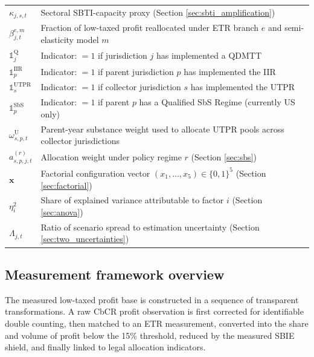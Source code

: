 \documentclass[11pt,a4paper]{article}
\begin{document}
\begin{table}[H]
\begin{tabular}{@{}ll@{}}
$\kappa_{j,s,t}$ & Sectoral SBTI-capacity proxy (Section \ref{sec:sbti_amplification}) \\
$\beta_{j,t}^{e,m}$ & Fraction of low-taxed profit reallocated under ETR branch $e$ and semi-elasticity model $m$ \\
$\mathbb{1}_j^{\text{Q}}$ & Indicator: $=1$ if jurisdiction $j$ has implemented a QDMTT \\
$\mathbb{1}_p^{\text{IIR}}$ & Indicator: $=1$ if parent jurisdiction $p$ has implemented the IIR \\
$\mathbb{1}_s^{\text{UTPR}}$ & Indicator: $=1$ if collector jurisdiction $s$ has implemented the UTPR \\
$\mathbb{1}_p^{\text{SbS}}$ & Indicator: $=1$ if parent $p$ has a Qualified SbS Regime (currently US only) \\
$\omega_{s,p,t}^{\text{U}}$ & Parent-year substance weight used to allocate UTPR pools across collector jurisdictions \\
$a_{s,p,j,t}^{(r)}$ & Allocation weight under policy regime $r$ (Section \ref{sec:sbs}) \\
$\mathbf{x}$ & Factorial configuration vector $(x_1, \ldots, x_5) \in \{0,1\}^5$ (Section \ref{sec:factorial}) \\
$\eta_i^2$ & Share of explained variance attributable to factor $i$ (Section \ref{sec:anova}) \\
$\Lambda_{j,t}$ & Ratio of scenario spread to estimation uncertainty (Section \ref{sec:two_uncertainties}) \\
\bottomrule
\end{tabular}
\end{table}

\newpage 

\subsection{Measurement framework overview}\label{sec:measurement_framework}

The measured low-taxed profit base is constructed in a sequence of transparent transformations. A raw CbCR profit observation is first corrected for identifiable double counting, then matched to an ETR measurement, converted into the share and volume of profit below the 15\% threshold, reduced by the measured SBIE shield, and finally linked to legal allocation indicators. 
\end{document}
